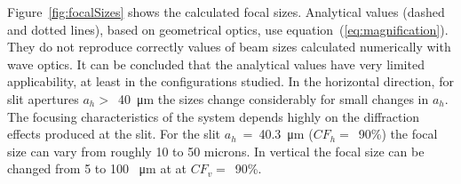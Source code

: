 \documentclass{iucr}              %
\begin{document}
Figure~\ref{fig:focalSizes} shows the calculated focal sizes. Analytical values (dashed and dotted lines), based on geometrical optics, use  equation~(\ref{eq:magnification}). They do not reproduce correctly values of beam sizes calculated numerically with wave optics. It can be concluded that the analytical values have very limited applicability, at least in the configurations studied.
In the horizontal direction, for slit apertures $a_h>$~\SI{40}{\micro\meter} the sizes change considerably for small changes in $a_h$. The focusing characteristics of the system depends highly on the diffraction effects produced at the slit. For the slit $a_h$~=~\SI{40.3}{\micro\meter} ($CF_h=$~90\%) the focal size can vary from roughly 10 to 50 microns.  In vertical the focal size can be changed from 5 to 100 \SI{}{\micro\meter} at at $CF_v=$~90\%.
\end{document}
